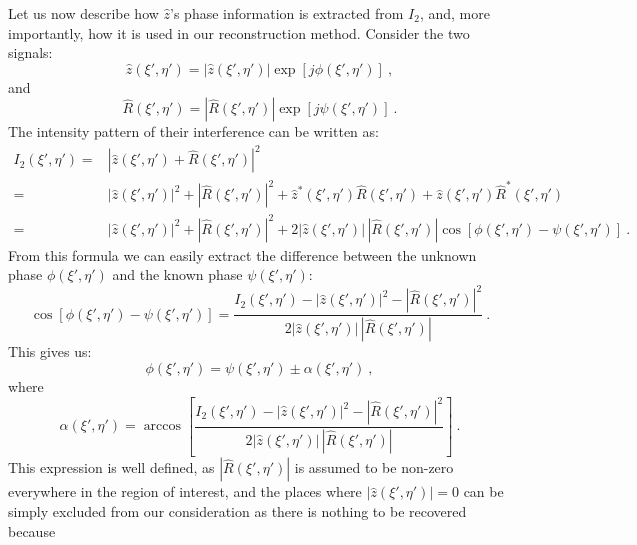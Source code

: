 Let us now describe  how $\hat{z}$'s phase information is extracted
from $I_{2}$, and, more importantly, how it is used in our
reconstruction method. Consider the two signals:
\begin{equation}
  \label{eq:phase-holo-5}
  \hat{z}(\xi',\eta') = |\hat{z}(\xi',\eta')|\exp[j\phi(\xi',\eta')]\ ,
\end{equation}
and
\begin{equation}
  \label{eq:phase-holo-6}
  \hat{R}(\xi',\eta') = |\hat{R}(\xi',\eta')|\exp[j\psi(\xi',\eta')]\ .
\end{equation}
The intensity pattern of their interference can be written as:
\begin{equation}
  \label{eq:phase-holo-7}
\begin{split}
  I_{2}(\xi',\eta')
  = &|\hat{z}(\xi',\eta') + \hat{R}(\xi',\eta')|^{2}\\
  = &|\hat{z}(\xi',\eta')|^{2} + |\hat{R}(\xi',\eta')|^{2}
  + \hat{z}^{*}(\xi',\eta')\hat{R}(\xi',\eta')
  + \hat{z}(\xi',\eta')\hat{R}^{*}(\xi',\eta')\\
  = & |\hat{z}(\xi',\eta')|^{2} + |\hat{R}(\xi',\eta')|^{2}
  +
  2|\hat{z}(\xi',\eta')|\,|\hat{R}(\xi',\eta')|\cos[\phi(\xi',\eta')-\psi(\xi',\eta')] 
  \ .
\end{split}
\end{equation}
From this formula we can easily extract the difference between the
unknown phase $\phi(\xi',\eta')$ and the known phase
$\psi(\xi',\eta')$:
\begin{equation}
  \label{eq:phase-holo-8}
  \cos[\phi(\xi',\eta')-\psi(\xi',\eta')] =
  \frac
  {I_{2}(\xi',\eta') -|\hat{z}(\xi',\eta')|^{2} - |\hat{R}(\xi',\eta')|^{2}}
  {2|\hat{z}(\xi',\eta')|\,|\hat{R}(\xi',\eta')|} \ .
\end{equation}
This gives us:
\begin{equation}
  \label{eq:phase-holo-9}
  \phi(\xi',\eta') = \psi(\xi',\eta') \pm \alpha(\xi',\eta')\ ,
\end{equation}
where
\begin{equation}
  \label{eq:phase-holo-10}
  \alpha(\xi',\eta') = \arccos
  \left[
    \frac
    {I_{2}(\xi',\eta') -|\hat{z}(\xi',\eta')|^{2} - |\hat{R}(\xi',\eta')|^{2}}
    {2|\hat{z}(\xi',\eta')|\,|\hat{R}(\xi',\eta')|}
  \right]\ .
\end{equation}
This expression is well defined, as $|\hat{R}(\xi',\eta')|$ is
assumed to be non-zero everywhere in the region of interest, and
the places where $|\hat{z}(\xi',\eta')|=0$ can be simply excluded
from our consideration as there is nothing to be recovered because
